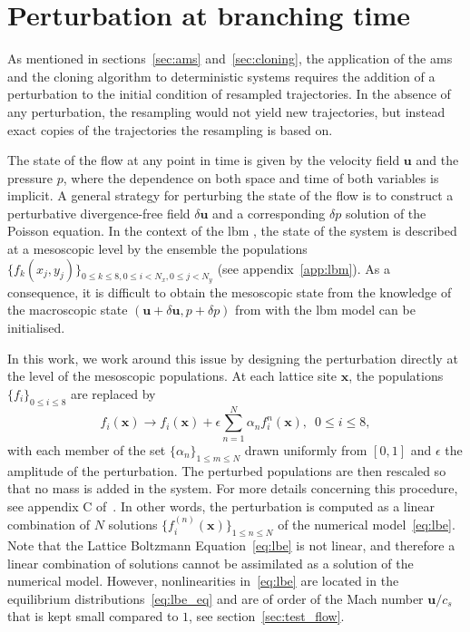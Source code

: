 \section{Perturbation at branching time}
\label{app:perturb_branching_time}
As mentioned in sections~\ref{sec:ams} and~\ref{sec:cloning}, the application of the \ac{ams} and the cloning algorithm to deterministic systems requires the addition of a perturbation to the initial condition of
resampled trajectories.
In the absence of any perturbation, the resampling would not yield new trajectories, but instead exact copies of the trajectories the resampling is based on.

The state of the flow at any point in time is given by the velocity field $\mathbf{u}$ and the pressure $p$, where the dependence on both space and time of both variables is implicit.
A general strategy for perturbing the state of the flow is to construct a perturbative divergence-free field $\delta \mathbf{u}$ and a corresponding $\delta p$ solution of the
Poisson equation.
In the context of the \ac{lbm} , the state of the system is described at a mesoscopic level by the ensemble the populations $\{f_k(x_j, y_j)\}_{0\le k \le 8, 0 \le i <N_x, 0 \le j < N_y}$ (see appendix~\ref{app:lbm}).
As a consequence, it is difficult to obtain the mesoscopic state from the knowledge of the macroscopic state $(\mathbf{u}+\delta \mathbf{u}, p + \delta p)$ from with the \ac{lbm} model can be initialised.

In this work, we work around this issue by designing the perturbation directly at the level of the mesoscopic populations.
At each lattice site $\mathbf{x}$, the populations $\{f_i\}_{0\le i \le 8}$ are replaced by
\begin{equation}
  f_{i}(\mathbf{x}) \longrightarrow f_i(\mathbf{x}) + \epsilon \sum_{n=1}^{N} \alpha_{n}f_{i}^{n}(\mathbf{x}), \,\,\, 0\leq i \leq 8,
  \label{eq:perturb_pop}
\end{equation}
with each member of the set $\{\alpha_n\}_{1\leq m \leq N}$ drawn uniformly from $[0,1]$ and $\epsilon$ the amplitude of the perturbation. The perturbed populations are then rescaled so that no mass is added in the system.
For more details concerning this procedure, see appendix C of~\cite{lestang:tel-01974316}.
In other words, the perturbation is computed as a linear combination of $N$ solutions $\{f_i^{(n)}(\mathbf{x})\}_{1\le n \le N}$ of the numerical model~\eqref{eq:lbe}.
Note that the Lattice Boltzmann Equation~\eqref{eq:lbe} is not linear, and therefore a linear combination of solutions cannot be assimilated as a solution of the numerical model.
However, nonlinearities in~\eqref{eq:lbe} are located in the equilibrium distributions~\eqref{eq:lbe_eq} and are of order of the Mach number $\mathbf{u}/c_s$ that is kept small compared to $1$, see section~\ref{sec:test_flow}.

